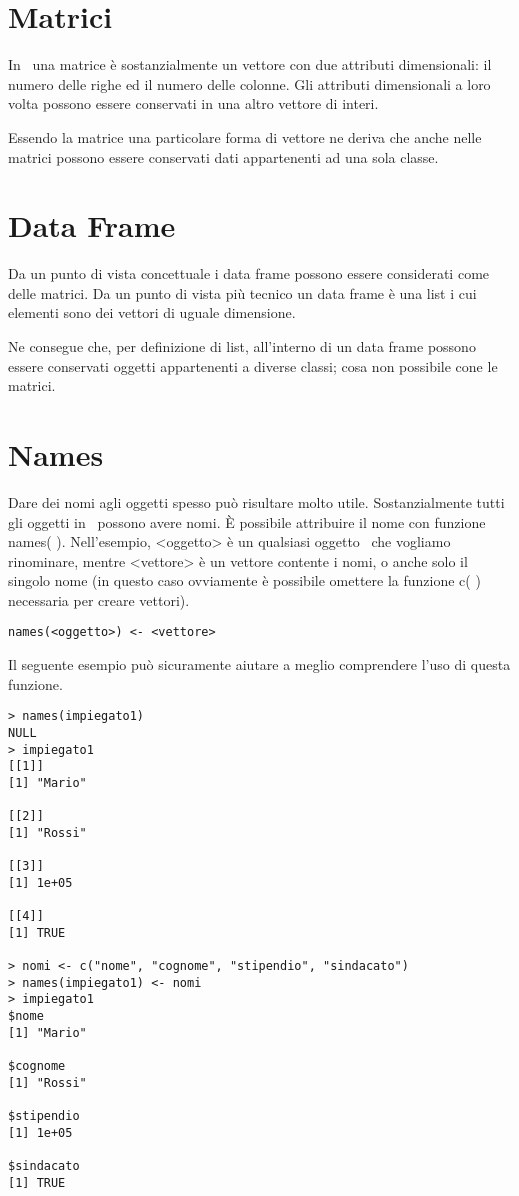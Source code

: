 \section{Matrici}

In \erre\ una matrice è sostanzialmente un vettore con due attributi dimensionali: il numero delle righe ed il numero delle colonne. Gli attributi dimensionali a loro volta possono essere conservati in una altro vettore di interi.

Essendo la matrice una particolare forma di vettore ne deriva che anche nelle matrici possono essere conservati dati appartenenti ad una sola classe.

\section{Data Frame}

Da un punto di vista concettuale i data frame possono essere considerati come delle matrici. Da un punto di vista più tecnico un data frame è una list i cui elementi sono dei vettori di uguale dimensione.

Ne consegue che, per definizione di list, all'interno di un data frame possono essere conservati oggetti appartenenti a diverse classi; cosa non possibile cone le matrici.

\section{Names}

Dare dei nomi agli oggetti spesso può risultare molto utile. Sostanzialmente tutti gli oggetti in \erre\ possono avere nomi. È possibile attribuire il nome con funzione \textsf{names( )}. Nell'esempio, <oggetto> è un qualsiasi oggetto \erre\ che vogliamo rinominare, mentre <vettore> è un vettore contente i nomi, o anche solo il singolo nome (in questo caso ovviamente è possibile omettere la funzione \textsf{c( )} necessaria per creare vettori).

\begin{lstlisting}
names(<oggetto>) <- <vettore>
\end{lstlisting}

Il seguente esempio può sicuramente aiutare a meglio comprendere l'uso di questa funzione.

\begin{lstlisting}
> names(impiegato1)
NULL
> impiegato1
[[1]]
[1] "Mario"

[[2]]
[1] "Rossi"

[[3]]
[1] 1e+05

[[4]]
[1] TRUE

> nomi <- c("nome", "cognome", "stipendio", "sindacato")
> names(impiegato1) <- nomi
> impiegato1
$nome
[1] "Mario"

$cognome
[1] "Rossi"

$stipendio
[1] 1e+05

$sindacato
[1] TRUE
\end{lstlisting}


